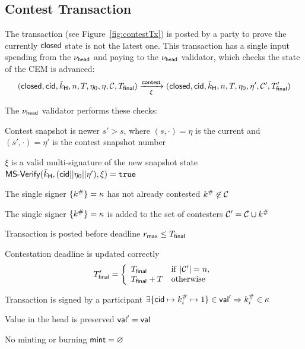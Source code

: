\subsection{Contest Transaction}\label{sec:contest-tx}

The \mtxContest{} transaction (see Figure~\ref{fig:contestTx}) is posted
by a party to prove the currently $\mathsf{closed}$ state is not the latest one. This
transaction has a single input spending from the $\nu_\mathsf{head}$ and paying to the
$\nu_\mathsf{head}$ validator, which checks the state of the CEM is advanced:
\[
	(\mathsf{closed},\mathsf{cid},\tilde{k}_{\mathsf{H}},n,T,\eta_0,\eta,\mathcal{C},T_{\mathsf{final}}) \xrightarrow[\xi]{\mathsf{contest}} (\mathsf{closed},\mathsf{cid},\tilde{k}_{\mathsf{H}},n,T,\eta_0,\eta',\mathcal{C}',T_{\mathsf{final}}')
\]

\begin{samepage}
	\noindent The $\nu_\mathsf{head}$ validator performs these checks:
	\begin{menumerate}
		\item Contest snapshot is newer $s' > s$, where $(s, \cdot) = \eta$ is the current and $(s', \cdot) = \eta'$ is the contest snapshot number
		\item $\xi$ is a valid multi-signature of the new snapshot state
		$\mathsf{MS\textsf{-}{}Verify}(\tilde{k}_{\mathsf{H}},(\mathsf{cid} || \eta_{0} || \eta'),\xi) = \mathtt{true}$
		\item The single signer $\{k^{\#}\} = \kappa$ has not already contested $k^{\#} \not\in \mathcal{C}$
		\item The single signer $\{k^{\#}\} = \kappa$ is added to the set of contesters $\mathcal{C}' = \mathcal{C} \cup k^{\#}$
		\item Transaction is posted before deadline $r_{\mathsf{max}} \leq T_{\mathsf{final}}$
		\item Contestation deadline is updated correctly
		\[
			T_{\mathsf{final}}' = \left\{\begin{array}{ll}
				T_{\mathsf{final}}     & \mathrm{if} ~ |\mathcal{C}'| = n, \\
				T_{\mathsf{final}} + T & \mathrm{otherwise}
			\end{array}\right.
		\]
		\item Transaction is signed by a participant $\exists \{\mathsf{cid} \mapsto k^{\#}_{i} \mapsto 1\} \in \mathsf{val}' \Rightarrow k^{\#}_{i} \in \kappa$
		\item Value in the head is preserved $\mathsf{val}' = \mathsf{val}$
		\item No minting or burning $\mathsf{mint} = \varnothing$
	\end{menumerate}
\end{samepage}

